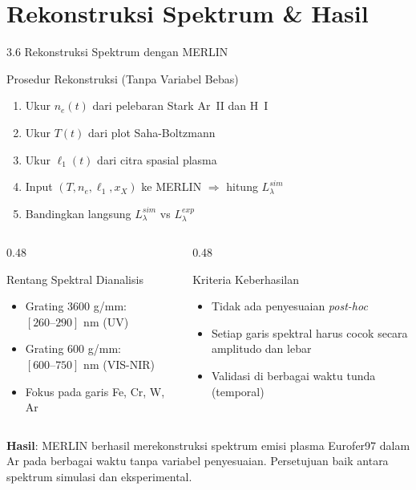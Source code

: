 \documentclass[aspectratio=169, 10pt]{beamer}
\begin{document}
\section{Rekonstruksi Spektrum \& Hasil}

\begin{frame}{3.6 Rekonstruksi Spektrum dengan MERLIN}
  \begin{block}{Prosedur Rekonstruksi (Tanpa Variabel Bebas)}
    \begin{enumerate}\small
      \item Ukur $n_e(t)$ dari pelebaran Stark Ar~II dan H~I
      \item Ukur $T(t)$ dari plot Saha-Boltzmann
      \item Ukur $\ell_1(t)$ dari citra spasial plasma
      \item Input $(T, n_e, \ell_1, x_X)$ ke MERLIN $\Rightarrow$ hitung $L_\lambda^{sim}$
      \item Bandingkan langsung $L_\lambda^{sim}$ vs $L_\lambda^{exp}$
    \end{enumerate}
  \end{block}

  \vspace{4pt}
  \begin{columns}[T]
    \begin{column}{0.48\textwidth}
      \begin{exampleblock}{Rentang Spektral Dianalisis}
        \begin{itemize}\small
          \item Grating 3600 g/mm: $[260\text{--}290]$ nm (UV)
          \item Grating 600 g/mm: $[600\text{--}750]$ nm (VIS-NIR)
          \item Fokus pada garis Fe, Cr, W, Ar
        \end{itemize}
      \end{exampleblock}
    \end{column}
    \begin{column}{0.48\textwidth}
      \begin{alertblock}{Kriteria Keberhasilan}
        \begin{itemize}\small
          \item Tidak ada penyesuaian \textit{post-hoc}
          \item Setiap garis spektral harus cocok secara amplitudo dan lebar
          \item Validasi di berbagai waktu tunda (temporal)
        \end{itemize}
      \end{alertblock}
    \end{column}
  \end{columns}

  \vspace{6pt}
  {\small \textbf{Hasil}: MERLIN berhasil merekonstruksi spektrum emisi plasma Eurofer97 dalam Ar pada berbagai waktu tanpa variabel penyesuaian. Persetujuan baik antara spektrum simulasi dan eksperimental.}
\end{frame}
\end{document}
